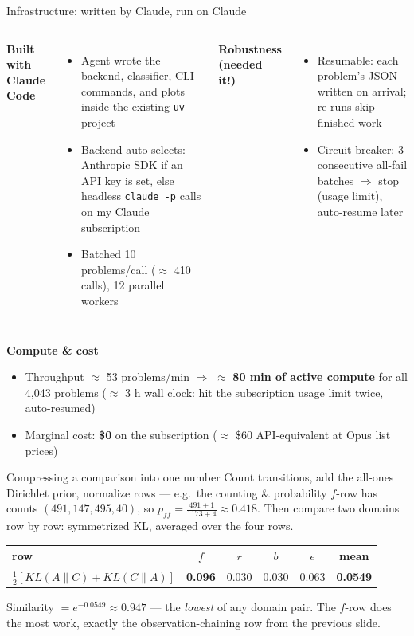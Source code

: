 \documentclass[10pt,aspectratio=169]{beamer}
\begin{document}
\begin{frame}{Infrastructure: written by Claude, run on Claude}
  \begin{columns}[T]
    \textbf{Built with Claude Code}
    \begin{itemize}
      \item Agent wrote the backend, classifier, CLI commands, and plots inside the
            existing \texttt{uv} project
      \item Backend auto-selects: Anthropic SDK if an API key is set, else headless
            \texttt{claude -p} calls on my Claude subscription
      \item Batched 10 problems/call ($\approx$ 410 calls), 12 parallel workers
    \end{itemize}
    \textbf{Robustness (needed it!)}
    \begin{itemize}
      \item Resumable: each problem's JSON written on arrival; re-runs skip finished work
      \item Circuit breaker: 3 consecutive all-fail batches $\Rightarrow$ stop
            (usage limit), auto-resume later
    \end{itemize}
  \end{columns}
  \bigskip
  \textbf{Compute \& cost}
  \begin{itemize}
    \item Throughput $\approx$ 53 problems/min $\Rightarrow$ $\approx$ \textbf{80 min of active compute}
          for all 4{,}043 problems ($\approx$ 3 h wall clock: hit the subscription usage limit twice, auto-resumed)
    \item Marginal cost: \textbf{\$0} on the subscription
          ($\approx$ \$60 API-equivalent at Opus list prices)
  \end{itemize}
\end{frame}


\begin{frame}{Compressing a comparison into one number}
  \footnotesize
  Count transitions, add the all-ones Dirichlet prior, normalize rows --- e.g.\ the
  counting \& probability $f$-row has counts $(491,147,495,40)$, so
  $p_{ff}=\frac{491+1}{1173+4}\approx 0.418$. Then compare two domains row by row:
  symmetrized KL, averaged over the four rows.
  \begin{center}
    \begin{tabular}{lcccc|c}
      \toprule
      row & $f$ & $r$ & $b$ & $e$ & mean \\
      \midrule
      $\tfrac12\!\left[KL(A\|C)+KL(C\|A)\right]$ & \textbf{0.096} & 0.030 & 0.030 & 0.063 & \textbf{0.0549} \\
      \bottomrule
    \end{tabular}
  \end{center}
  \smallskip
  Similarity $=e^{-0.0549}\approx 0.947$ --- the \emph{lowest} of any domain pair.
  The $f$-row does the most work, exactly the observation-chaining row from the
  previous slide.
\end{frame}
\end{document}

